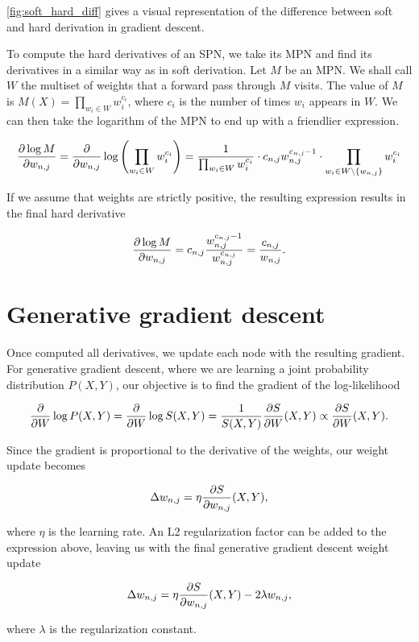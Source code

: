 \autoref{fig:soft_hard_diff} gives a visual representation of the difference between soft and hard
derivation in gradient descent.

To compute the hard derivatives of an SPN, we take its MPN and find its derivatives in a similar
way as in soft derivation. Let $M$ be an MPN\@. We shall call $W$ the multiset of weights that a
forward pass through $M$ visits. The value of $M$ is $M(X)=\prod_{w_i\in W}w_i^{c_i}$, where $c_i$
is the number of times $w_i$ appears in $W$. We can then take the logarithm of the MPN to end up
with a friendlier expression.

\begin{equation*}
  \frac{\partial\log M}{\partial w_{n,j}}=\frac{\partial}{\partial w_{n,j}}\log\left(\prod_{w_i\in W}w_i^{c_i}\right)=
    \frac{1}{\prod_{w_i\in W}w_i^{c_i}}\cdot c_{n,j}w_{n,j}^{c_{n,j}-1}\cdot\prod_{w_i\in
      W\setminus\{w_{n,j}\}}w_i^{c_i}
\end{equation*}

If we assume that weights are strictly positive, the resulting expression results in the final
hard derivative

\begin{equation}
  \frac{\partial\log M}{\partial w_{n,j}}=c_{n,j}\frac{w_{n,j}^{c_{n,j}-1}}{w_{n,j}^{c_{n,j}}}=
    \frac{c_{n,j}}{w_{n,j}}.
\end{equation}

\section{Generative gradient descent}

Once computed all derivatives, we update each node with the resulting gradient. For generative
gradient descent, where we are learning a joint probability distribution $P(X,Y)$, our objective is
to find the gradient of the log-likelihood

\begin{equation*}
  \frac{\partial}{\partial W}\log P(X,Y)=\frac{\partial}{\partial W}\log S(X,Y)=\frac{1}{S(X,Y)}\frac{\partial S}{\partial W}(X,Y)\propto
    \frac{\partial S}{\partial W}(X,Y).
\end{equation*}

Since the gradient is proportional to the derivative of the weights, our weight update becomes

\begin{equation*}
  \Delta w_{n,j}=\eta\frac{\partial S}{\partial w_{n,j}}(X, Y),
\end{equation*}

where $\eta$ is the learning rate. An L2 regularization factor can be added to the expression
above, leaving us with the final generative gradient descent weight update

\begin{equation}\label{eq:gen_weight_update}
  \Delta w_{n,j}=\eta\frac{\partial S}{\partial w_{n,j}}(X, Y)-2\lambda w_{n,j},
\end{equation}

where $\lambda$ is the regularization constant.
